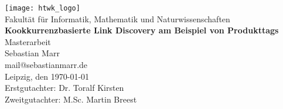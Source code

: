 \thispagestyle{plain}
\begin{titlepage}
\begin{center}
\texttt{[image: htwk\_logo]}\\
\vspace{0.3cm}
\normalsize
Fakultät für Informatik, Mathematik und Naturwissenschaften\\
\vspace{2.3cm}
\huge{\textbf{\textsf{Kookkurrenzbasierte Link Discovery am Beispiel von Produkttags}}}\\
\vspace{1cm}
\LARGE{\textsf{Masterarbeit}}\\
\vspace{2.3cm}
\normalsize
Sebastian Marr\\
mail@sebastianmarr.de\\
Leipzig, den \today\\
\vspace{2.3cm}
Erstgutachter: Dr. Toralf Kirsten \\
Zweitgutachter: M.Sc. Martin Breest
\end{center}
\end{titlepage}
